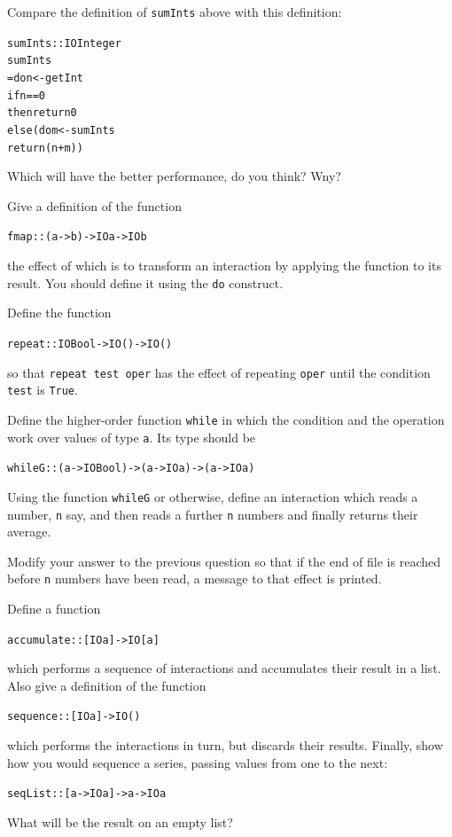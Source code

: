 \begin{exercises}

\item
Compare the definition of \texttt{sumInts} above with this definition:
\begin{alltt}
sumInts :: IO Integer
sumInts
  = do n <- getInt
       if n==0 
          then return 0
          else (do m <- sumInts
                   return (n+m))
\end{alltt}
Which will have the better performance, do you think? Wny?

\item
Give a definition of the function
\begin{alltt}
fmap :: (a -> b) -> IO a -> IO b
\end{alltt}
the effect of which is to transform an interaction by applying the function to its
result. You should define it using the \texttt{do} construct.

\item
Define the function
\begin{alltt}
repeat ::  IO Bool -> IO () -> IO ()
\end{alltt}
so that \texttt{repeat test oper} has the effect of repeating \texttt{oper} until
the condition \texttt{test} is \texttt{True}.

\item
Define the higher-order function \texttt{while} in which the condition and the operation
work over values of type \texttt{a}. Its type should be
\begin{alltt}
whileG :: (a -> IO Bool) -> (a -> IO a) -> (a -> IO a)
\end{alltt}

\item 
Using the function \texttt{whileG} or otherwise, define an interaction which
reads a number, \texttt{n} say, and then reads a further \texttt{n} numbers and
finally returns their average.

\item
Modify your answer to the previous question so that if the end of file is
reached before \texttt{n} numbers have been read, a message to that effect is
printed.

\item
Define a function
\begin{alltt}
accumulate :: [IO a] -> IO [a]
\end{alltt}
which performs a sequence of interactions and accumulates their result in a
list. Also give a definition of the function
\begin{alltt}
sequence :: [IO a] -> IO ()
\end{alltt}
which performs the interactions in turn, but discards their results. Finally,
show how you would sequence a series, passing values from one to the next:
\begin{alltt}
seqList :: [a -> IO a] -> a -> IO a
\end{alltt}
What will be the result on an empty list?
\end{exercises}

